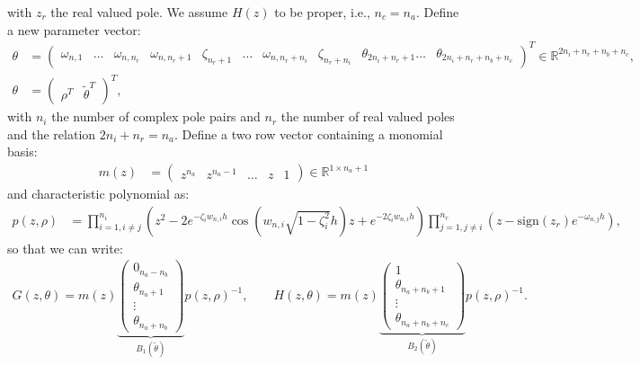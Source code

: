 \documentclass{article}
\begin{document}
with $z_r$ the real valued pole. We assume $H(z)$ to be proper, i.e., $n_c=n_a$. Define a new parameter vector:
\begin{equation}
\begin{aligned}
\theta  &= \begin{pmatrix} \omega_{n,1} & \ldots & \omega_{n,n_r} & \omega_{n,n_r+1} & \zeta_{n_r+1} & \ldots & \omega_{n,n_r+n_i} & \zeta_{n_r+n_i} & \theta_{2n_i+n_r+1} \ldots & \theta_{2n_i+n_r+n_b+n_c} \end{pmatrix}^T \in \mathbb{R}^{2n_i+n_r+n_b+n_c}, \\
\theta &= \begin{pmatrix} \rho^T & \tilde{\theta}^T \end{pmatrix}^T, \nonumber
\end{aligned}
\end{equation}
with $n_i$ the number of complex pole pairs and $n_r$ the number of real valued poles and the relation $2n_i+n_r=n_a$. Define a two row vector containing a monomial basis:
\begin{equation}
\begin{aligned}
m(z) &= \begin{pmatrix} z^{n_a} & z^{n_a-1} & \dots & z & 1 \end{pmatrix} \in \mathbb{R}^{1 \times n_a+1}
\end{aligned}
\end{equation} 
and characteristic polynomial as:
\begin{equation}
\begin{aligned}
p(z,\rho) &= \prod_{i=1, i \neq j}^{n_i} \left( z^2 - 2 e^{-\zeta_i w_{n,i} h } \cos (w_{n,i} \sqrt{1-\zeta_i^2} h) z + e^{-2 \zeta_i w_{n,i} h}  \right)  \prod_{j=1, j \neq i}^{n_r} \left(  z- \text{sign}(z_r) e^{-\omega_{n,j}h} \right),
\end{aligned}
\end{equation}
so that we can write:
\begin{equation}
\begin{aligned}
G(z,\theta) = m(z) \underbrace{\begin{pmatrix} 0_{n_a-n_b} \\ \theta_{n_a+1}  \\ \vdots \\ \theta_{n_a+n_b} \end{pmatrix}}_{B_1(\tilde{\theta})} p(z,\rho)^{-1}, \qquad H(z,\theta) =   m(z) \underbrace{\begin{pmatrix}  1 \\  \theta_{n_a+n_b+1}  \\ \vdots \\ \theta_{n_a+n_b+n_c} \end{pmatrix}}_{B_2(\tilde{\theta})} p(z,\rho)^{-1}.
\end{aligned}
\end{equation}
\end{document}
